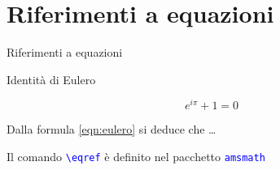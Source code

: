 \section{Riferimenti a equazioni}
  \begin{frame}{Riferimenti a equazioni}

    \begin{exampleblock}{Identità di Eulero}
      
    \end{exampleblock}

    \begin{equation}
      \label{eqn:eulero}
      e^{i\pi}+1=0
    \end{equation}

    Dalla formula \eqref{eqn:eulero} si deduce che \dots
    
    Il comando \texttt{\textcolor{blue}{\textbackslash eqref}} è definito nel pacchetto \texttt{\textcolor{blue}{amsmath}}

\end{frame}

